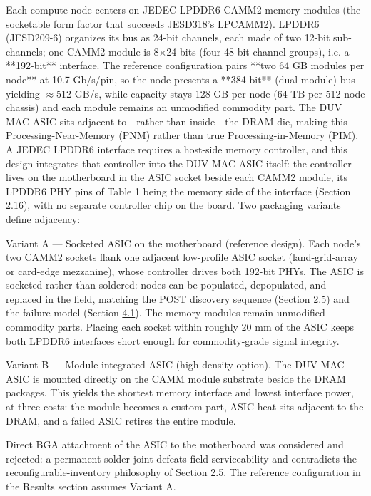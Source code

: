 \documentclass[12pt,onecolumn]{article}
\begin{document}
Each compute node centers on JEDEC LPDDR6 CAMM2 memory modules (the socketable form factor that succeeds JESD318's LPCAMM2)\cite{16,17}. LPDDR6 (JESD209-6) organizes its bus as 24-bit channels, each made of two 12-bit sub-channels; one CAMM2 module is 8$\times$24 bits (four 48-bit channel groups), i.e. a **192-bit** interface. The reference configuration pairs **two 64 GB modules per node** at 10.7 Gb/s/pin, so the node presents a **384-bit** (dual-module) bus yielding $\approx$512 GB/s, while capacity stays 128 GB per node (64 TB per 512-node chassis) and each module remains an unmodified commodity part. The DUV MAC ASIC sits adjacent to---rather than inside---the DRAM die, making this Processing-Near-Memory (PNM) rather than true Processing-in-Memory (PIM). A JEDEC LPDDR6 interface requires a host-side memory controller, and this design integrates that controller into the DUV MAC ASIC itself: the controller lives on the motherboard in the ASIC socket beside each CAMM2 module, its LPDDR6 PHY pins of Table 1 being the memory side of the interface (Section \hyperref[sec:2.16]{2.16}), with no separate controller chip on the board. Two packaging variants define adjacency:

Variant A --- Socketed ASIC on the motherboard (reference design). Each node's two CAMM2 sockets flank one adjacent low-profile ASIC socket (land-grid-array or card-edge mezzanine), whose controller drives both 192-bit PHYs. The ASIC is socketed rather than soldered: nodes can be populated, depopulated, and replaced in the field, matching the POST discovery sequence (Section \hyperref[sec:2.5]{2.5}) and the failure model (Section \hyperref[sec:4.1]{4.1}). The memory modules remain unmodified commodity parts. Placing each socket within roughly 20 mm of the ASIC keeps both LPDDR6 interfaces short enough for commodity-grade signal integrity.

Variant B --- Module-integrated ASIC (high-density option). The DUV MAC ASIC is mounted directly on the CAMM module substrate beside the DRAM packages. This yields the shortest memory interface and lowest interface power, at three costs: the module becomes a custom part, ASIC heat sits adjacent to the DRAM, and a failed ASIC retires the entire module.

Direct BGA attachment of the ASIC to the motherboard was considered and rejected: a permanent solder joint defeats field serviceability and contradicts the reconfigurable-inventory philosophy of Section \hyperref[sec:2.5]{2.5}. The reference configuration in the Results section assumes Variant A.
\end{document}
